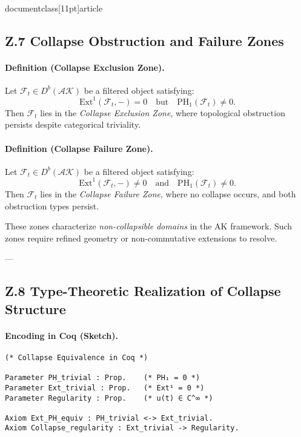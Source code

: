 \\documentclass[11pt]{article}
\begin{document}
\subsection*{Z.7 Collapse Obstruction and Failure Zones}

\paragraph{Definition (Collapse Exclusion Zone).}
Let \( \mathcal{F}_t \in D^b(\mathcal{AK}) \) be a filtered object satisfying:
\[
\mathrm{Ext}^1(\mathcal{F}_t, -) = 0 \quad \text{but} \quad \mathrm{PH}_1(\mathcal{F}_t) \neq 0.
\]
Then \( \mathcal{F}_t \) lies in the \emph{Collapse Exclusion Zone}, where topological obstruction persists despite categorical triviality.

\paragraph{Definition (Collapse Failure Zone).}
Let \( \mathcal{F}_t \in D^b(\mathcal{AK}) \) be a filtered object satisfying:
\[
\mathrm{Ext}^1(\mathcal{F}_t, -) \neq 0 \quad \text{and} \quad \mathrm{PH}_1(\mathcal{F}_t) \neq 0.
\]
Then \( \mathcal{F}_t \) lies in the \emph{Collapse Failure Zone}, where no collapse occurs, and both obstruction types persist.

These zones characterize \emph{non-collapsible domains} in the AK framework.  
Such zones require refined geometry or non-commutative extensions to resolve.

---

\subsection*{Z.8 Type-Theoretic Realization of Collapse Structure}

\paragraph{Encoding in Coq (Sketch).}

\begin{lstlisting}[language=Coq, caption=Collapse Structure Encoded in Coq Type Theory]
(* Collapse Equivalence in Coq *)

Parameter PH_trivial : Prop.    (* PH₁ = 0 *)
Parameter Ext_trivial : Prop.   (* Ext¹ = 0 *)
Parameter Regularity : Prop.    (* u(t) ∈ C^∞ *)

Axiom Ext_PH_equiv : PH_trivial <-> Ext_trivial.
Axiom Collapse_regularity : Ext_trivial -> Regularity.
\end{lstlisting}
\end{document}
